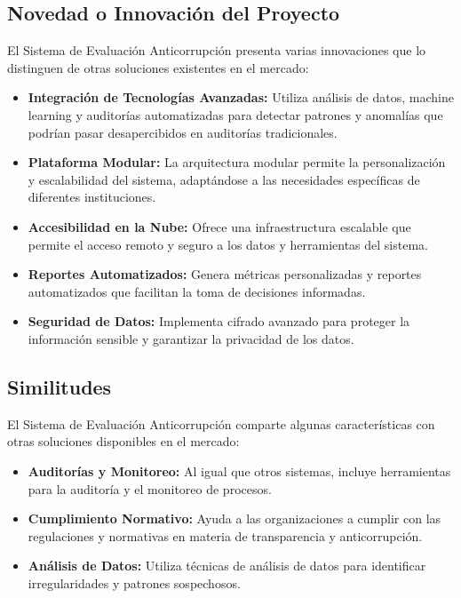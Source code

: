 \documentclass[a4paper,12pt]{article}
\begin{document}
\subsection{Novedad o Innovación del Proyecto}
El Sistema de Evaluación Anticorrupción presenta varias innovaciones que lo distinguen de otras soluciones existentes en el mercado:

\begin{itemize}
    \item \textbf{Integración de Tecnologías Avanzadas:} Utiliza análisis de datos, machine learning y auditorías automatizadas para detectar patrones y anomalías que podrían pasar desapercibidos en auditorías tradicionales.
    \item \textbf{Plataforma Modular:} La arquitectura modular permite la personalización y escalabilidad del sistema, adaptándose a las necesidades específicas de diferentes instituciones.
    \item \textbf{Accesibilidad en la Nube:} Ofrece una infraestructura escalable que permite el acceso remoto y seguro a los datos y herramientas del sistema.
    \item \textbf{Reportes Automatizados:} Genera métricas personalizadas y reportes automatizados que facilitan la toma de decisiones informadas.
    \item \textbf{Seguridad de Datos:} Implementa cifrado avanzado para proteger la información sensible y garantizar la privacidad de los datos.
\end{itemize}

\subsection{Similitudes}
El Sistema de Evaluación Anticorrupción comparte algunas características con otras soluciones disponibles en el mercado:

\begin{itemize}
    \item \textbf{Auditorías y Monitoreo:} Al igual que otros sistemas, incluye herramientas para la auditoría y el monitoreo de procesos.
    \item \textbf{Cumplimiento Normativo:} Ayuda a las organizaciones a cumplir con las regulaciones y normativas en materia de transparencia y anticorrupción.
    \item \textbf{Análisis de Datos:} Utiliza técnicas de análisis de datos para identificar irregularidades y patrones sospechosos.
\end{itemize}
\end{document}
